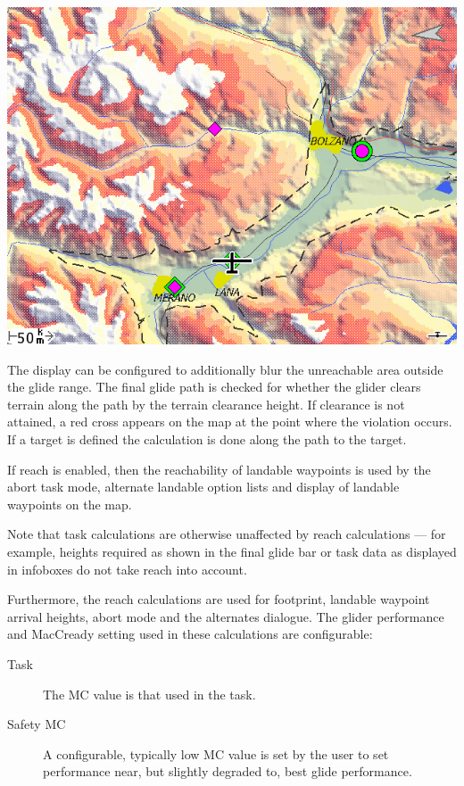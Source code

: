 \begin{description}
\begin{center}
\includegraphics[angle=0,width=1.0\linewidth,keepaspectratio='true']{figures/reach2.png}
\end{center}

\end{description}

The display can be configured to additionally blur the unreachable area
outside the glide range. 
The final glide path is checked for whether the glider clears terrain along
the path by the terrain clearance height.  If clearance is not attained, a red
cross appears on the map at the point where the violation occurs. If a target is
defined the calculation is done along the path to the target. 

If reach is enabled, then the reachability of landable waypoints is used
by the abort task mode, alternate landable option lists and display of
landable waypoints on the map.

Note that task calculations are otherwise unaffected by reach
calculations --- for example, heights required as shown in the final
glide bar or task data as displayed in infoboxes do not take reach into account.

Furthermore, the reach calculations are used for footprint, landable
waypoint arrival heights, abort mode and the alternates dialogue.  The glider
performance and MacCready setting used in these calculations are configurable:
\begin{description}
\item[Task] The MC value is that used in the task.
\item[Safety MC] A configurable, typically low MC value is set by the user to set
 performance near, but slightly degraded to, best glide performance.

\end{description}

